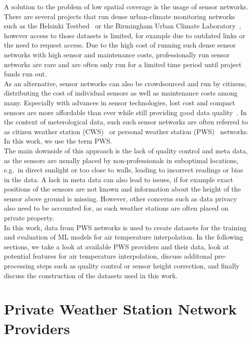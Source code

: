 A solution to the problem of low spatial coverage is the usage of sensor networks. There are several projects that run dense urban-climate monitoring networks~\cite{muller2013sensors} such as the Helsinki Testbed~\cite{koskinen2011helsinki} or the Birmingham Urban Climate Laboratory~\cite{warren2016birmingham}, however access to those datasets is limited, for example due to outdated links or the need to request access. Due to the high cost of running such dense sensor networks with high sensor and maintenance costs, professionally run sensor networks are rare and are often only run for a limited time period until project funds run out.\\
As an alternative, sensor networks can also be crowdsourced and run by citizens, distributing the cost of individual sensors as well as maintenance costs among many. Especially with advances in sensor technologies, lost cost and compact sensors are more affordable than ever while still providing good data quality~\cite{grimmond2006progress, rundel2009environmental}. In the context of meterological data, such such sensor networks are often referred to as citizen weather station (CWS)~\cite{meier2017crowdsourcing} or personal weather station (PWS)~\cite{hahn2022observations} networks. In this work, we use the term PWS.\\
The main downside of this approach is the lack of quality control and meta data, as the sensors are usually placed by non-professionals in suboptimal locations, e.g.\ in direct sunlight or too close to walls, leading to incorrect readings or bias in the data. A lack in meta data can also lead to issues, if for example exact positions of the sensors are not known and information about the height of the sensor above ground is missing. However, other concerns such as data privacy also need to be accounted for, as such weather stations are often placed on private property.\\
In this work, data from PWS networks is used to create datasets for the training and evaluation of ML models for air temperature interpolation. In the following sections, we take a look at available PWS providers and their data, look at potential features for air temperature interpolation, discuss additonal pre-processing steps such as quality control or sensor height correction, and finally discuss the construction of the datasets used in this work.

\section{Private Weather Station Network Providers}

